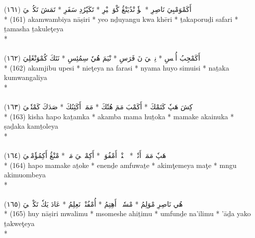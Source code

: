 \documentclass[a4paper, 12pt]{report}
\begin{document}
\begin{center}
\textarabic{(١٦١) \textcolor{mygreen}{أَكَمْوَمْبِيَ نَاصِرِ  * يٖؤٗ نْدُيَنْڠُ كْوَ خٖيْرِ  * تَكَپٗرُدِ سَفَرِ  * تَمَشَ تَكُلٖٹٖيَ }} \\* 
(161) akamwambiya nāṣiri  * yeo nḏuyangu kwa khēri  * ṯakaporuḏi safari  * ṯamasha ṯakuleţeya  \\* 
 \\ 
\\[8mm] 

\textarabic{(١٦٢) \textcolor{mygreen}{أَكَمْجِبُ أُپٖسِ  * نِئٖٹٖيَ نَ فَرَسِ  * نْيَمَ هُيٗ سِمُئِسِ  * نَتَكَ كُمْوَنْڠَلِيَ }} \\* 
(162) akamjibu upesi  * nieţeya na farasi  * nyama huyo simuisi  * naṯaka kumwangaliya  \\* 
 \\ 
\\[8mm] 

\textarabic{(١٦٣) \textcolor{mygreen}{كِشَ هَپٗ كَتَمْكَ  * أَكَمْبَ مَمَ هُتٗكَ  * مَمَكٖ أَكَئِنُكَ  * صَدَكَ كَمْتٗلٖيَ }} \\* 
(163) kisha hapo kaṯamka  * akamba mama huṯoka  * mamake akainuka  * ṣaḏaka kamṯoleya  \\* 
 \\ 
\\[8mm] 

\textarabic{(١٦٤) \textcolor{mygreen}{هَپٗ مَمَكٖ أَتٗكٖ  * إٖنٖنْدٖ أَمْفُوَتٖ  * أَكِمْٹٖمٖيَ مَٹٖ  * مْنْڠُ أَكِمُؤٗمْبٖيَ }} \\* 
(164) hapo mamake aṯoke  * enenḏe amfuwaṯe  * akimţemeya maţe  * mngu akimuombeya  \\* 
 \\ 
\\[8mm] 

\textarabic{(١٦٥) \textcolor{mygreen}{هُي نَاصِرِ مْوَلِمُ  * مْسٗمٖشٖ أَهِتِمُ  * أُمْفُنْدٖ نَعِلِمُ  * عَادَ يَكٗ تَكْوٖٹٖيَ }} \\* 
(165) huy nāṣiri mwalimu  * msomeshe ahiṯimu  * umfunḏe na'ilimu  * 'āḏa yako ṯakweţeya  \\* 
 \\ 
\\[8mm] 


\end{center}
\end{document}
